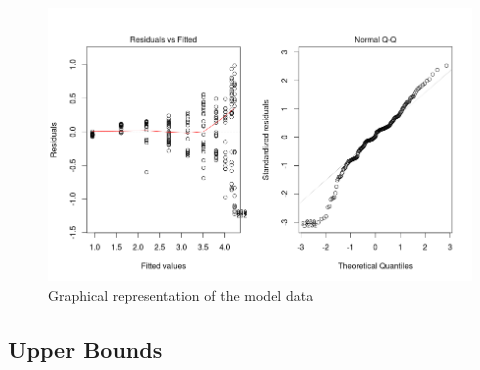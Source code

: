 \begin{figure}[h]
\begin{center}
\includegraphics[scale=0.45]{./img/model_plots.png}
\caption{Graphical representation of the model data}
\end{center}
\end{figure}

\subsection{Upper Bounds}\label{upper-bounds}

